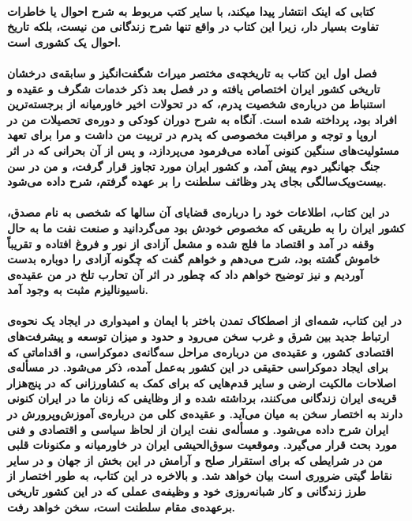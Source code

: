 \paragraph{
	کتابی که اینک انتشار پیدا میکند، با سایر کتب مربوط به شرح احوال یا خاطرات تفاوت بسیار دار، زیرا این کتاب در واقع تنها شرح زندگانی من نیست، بلکه تاریخ احوال یک کشوری است. 
}
\paragraph{
	فصل اول این کتاب به تاریخچه‌ی مختصر میراث شگفت‌انگیز و سابقه‌ی درخشان تاریخی کشور ایران اختصاص یافته و در فصل بعد ذکر خدمات شگرف و عقیده و استنباط من درباره‌ی شخصیت پدرم، که در تحولات اخیر خاورمیانه از برجسته‌ترین افراد بود، پرداخته شده است. آنگاه به شرح دوران کودکی و دوره‌ی تحصیلات من در اروپا و توجه و مراقبت مخصوصی که پدرم در تربیت من داشت و مرا برای تعهد مسئولیت‌های سنگین کنونی آماده می‌فرمود می‌پردازد، و پس از آن بحرانی که در اثر جنگ جهانگیر دوم پیش آمد، و کشور ایران مورد تجاوز قرار گرفت، و من در سن بیست‌و‌یک‌سالگی بجای پدر وظائف سلطنت را بر عهده گرفتم، شرح داده می‌شود.
} 
\paragraph{
	در این کتاب، اطلاعات خود را درباره‌ی قضایای آن سالها که شخصی به نام \gls{مصدق}، کشور ایران را به طریقی که مخصوص خودش بود می‌گردانید و صنعت نفت ما به حال وقفه در آمد و اقتصاد ما فلج شده و مشعل آزادی از نور و فروغ افتاده و تقریباً خاموش گشته بود، شرح می‌دهم و خواهم گفت که چگونه آزادی را دوباره بدست آوردیم و نیز توضیح خواهم داد که چطور در اثر آن تحارب تلخ در من عقیده‌ی ناسیونالیزم مثبت به وجود آمد.  
}
\paragraph{
	در این کتاب، شمه‌ای از اصطکاک تمدن باختر با ایمان و امیدواری در ایجاد یک نحوه‌ی ارتباط جدید بین شرق و غرب سخن می‌رود و حدود و میزان توسعه و پیشرفت‌های اقتصادی کشور، و عقیده‌ی من درباره‌ی مراحل سه‌گانه‌ی دموکراسی، و اقداماتی که برای ایجاد دموکراسی حقیقی در این کشور به‌عمل آمده، ذکر می‌شود. در مسأله‌ی اصلاحات مالکیت ارضی و سایر قدم‌هایی که برای کمک به کشاورزانی که در پنج‌هزار قریه‌ی ایران زندگانی می‌کنند، برداشته شده و از وظایفی که زنان ما در ایران کنونی دارند به اختصار سخن به میان می‌آید. و عقیده‌ی کلی من درباره‌ی آموزش‌و‌پرورش در ایران شرح داده می‌شود. 
	و مسأله‌ی نفت ایران از لحاظ سیاسی و اقتصادی و فنی مورد بحث قرار می‌گیرد. وموقعیت سوق‌الحیشی ایران در خاورمیانه و مکنونات قلبی من در شرایطی که برای استقرار صلح و آرامش در این بخش از جهان و در سایر نقاط گیتی ضروری است بیان خواهد شد. و بالاخره در این کتاب، به طور اختصار از طرز زندگانی و کار شبانه‌روزی خود و وظیفه‌ی عملی که در این کشور تاریخی برعهده‌ی مقام سلطنت است، سخن خواهد رفت.   
}
